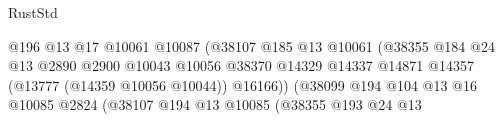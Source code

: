 \begin{lexlean}{RustStd}
\begin{coremodule}
                                                          @196
                                                          @13
                                                          @17
                                                          @10061
                                                          @10087
                                                          (@38107
                                                            @185
                                                            @13
                                                            @10061
                                                            (@38355
                                                              @184
                                                              @24
                                                              @13
                                                              @2890
                                                              @2900
                                                              @10043
                                                              @10056
                                                              @38370
                                                              @14329
                                                              @14337
                                                              @14871
                                                              @14357
                                                              (@13777 (@14359 @10056 @10044))
                                                              @16166))
                                                          (@38099
                                                            @194
                                                            @104
                                                            @13
                                                            @16
                                                            @10085
                                                            @2824
                                                            (@38107
                                                              @194
                                                              @13
                                                              @10085
                                                              (@38355
                                                                @193
                                                                @24
                                                                @13

\end{coremodule}
\end{lexlean}
